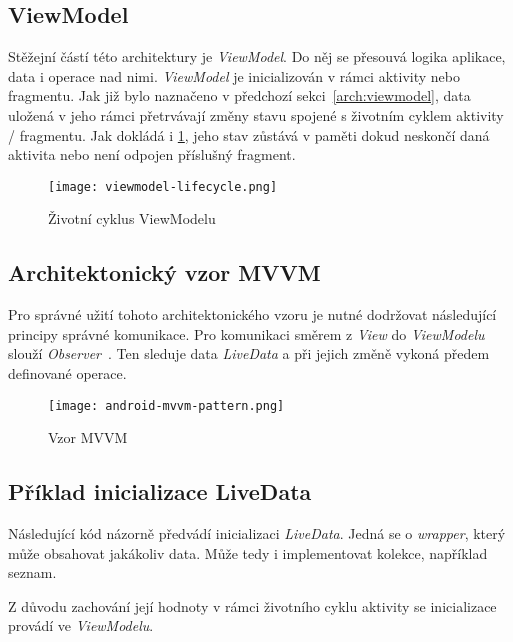         \subsection{ViewModel}
        Stěžejní částí této architektury je \emph{ViewModel}. Do něj se přesouvá logika aplikace, data i operace nad nimi. \emph{ViewModel} je inicializován v rámci aktivity nebo fragmentu. Jak již bylo naznačeno v předchozí sekci~\ref{arch:viewmodel}, data uložená v jeho rámci přetrvávají změny stavu spojené s životním cyklem aktivity / fragmentu. Jak dokládá i \ref{diagram:viewmodel_lifecycle}, jeho stav zůstává v paměti dokud neskončí daná aktivita nebo není odpojen příslušný fragment.

        \begin{figure}[h!]
            \centering
            \texttt{[image: viewmodel-lifecycle.png]}
            \caption[Životní cyklus ViewModelu]{Životní cyklus ViewModelu\cite{viewmodel-lifecycle}}
            \label{diagram:viewmodel_lifecycle}
        \end{figure}

        \newpage
        \subsection{Architektonický vzor MVVM}
        Pro správné užití tohoto architektonického vzoru je nutné dodržovat následující principy správné komunikace. Pro komunikaci směrem z \emph{View} do \emph{ViewModelu} slouží \emph{Observer}~\cite{livedata}. Ten sleduje data \emph{LiveData} a při jejich změně vykoná předem definované operace.

        \begin{figure}[h!]
            \centering
            \texttt{[image: android-mvvm-pattern.png]}
            \caption[Vzor MVVM]{Vzor MVVM~\cite{mvvm-pattern}}
            \label{diagram:mvvm_pattern}
        \end{figure}

        \subsection{Příklad inicializace LiveData}
        Následující kód názorně předvádí inicializaci \emph{LiveData}. Jedná se o \emph{wrapper}, který může obsahovat jakákoliv data. Může tedy i implementovat kolekce, například seznam.

        Z důvodu zachování její hodnoty v rámci životního cyklu aktivity se inicializace provádí ve \emph{ViewModelu}.

